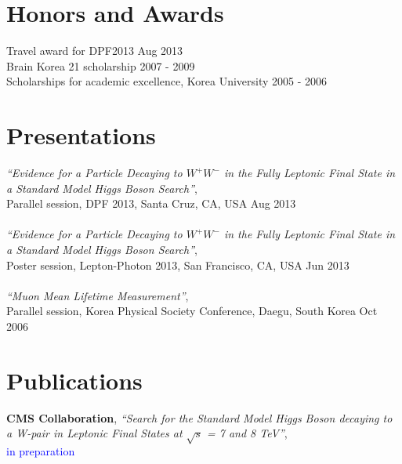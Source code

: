 \documentclass[margin]{res}
\begin{document}
\begin{resume}
\section{Honors and Awards} 
Travel award for DPF2013                                \hfill Aug 2013 \\
Brain Korea 21 scholarship                              \hfill 2007 - 2009 \\
Scholarships for academic excellence, Korea University  \hfill 2005 - 2006 \\


\section{Presentations } 
\textit{``Evidence for a Particle Decaying to $W^+W^-$ in the Fully Leptonic Final State 
in a Standard Model Higgs Boson Search''}, \\ 
Parallel session, DPF 2013, Santa Cruz, CA, USA  
\hfill{Aug 2013}
\\
\\
\textit{``Evidence for a Particle Decaying to $W^+W^-$ in the Fully Leptonic Final State 
in a Standard Model Higgs Boson Search''}, \\
Poster session, Lepton-Photon 2013, San Francisco, CA, USA  
\hfill{Jun 2013}
\\
\\
\textit{``Muon Mean Lifetime Measurement''}, \\
Parallel session, Korea Physical Society Conference, Daegu, South Korea  
\hfill{Oct 2006}

\section{Publications}
\textbf{CMS Collaboration}, \textit{``Search for the Standard Model Higgs
Boson decaying to a W-pair in Leptonic Final States at $\sqrt{s}$ = 7 and 8 TeV''}, \\
\textcolor{blue}{in preparation}  
\\ 
\\

\end{resume}
\end{document}

